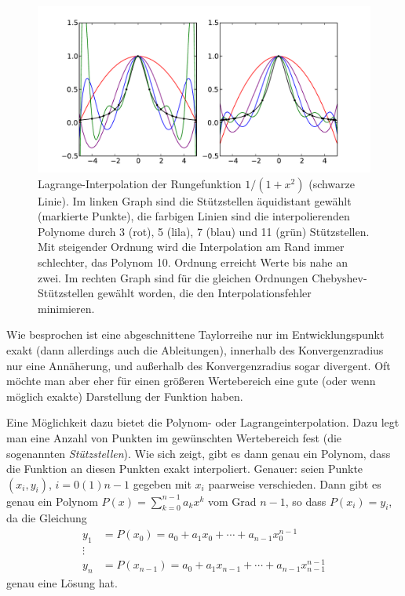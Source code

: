 \begin{figure}
  \centering
  \includegraphics[width=\textwidth]{plots/runge_lagrange}
  \caption{Lagrange-Interpolation der Rungefunktion $1/(1+x^2)$
    (schwarze Linie). Im linken Graph sind die Stützstellen
    äquidistant gewählt (markierte Punkte), die farbigen Linien sind
    die interpolierenden Polynome durch 3 (rot), 5 (lila), 7 (blau)
    und 11 (grün) Stützstellen. Mit steigender Ordnung wird die
    Interpolation am Rand immer schlechter, das Polynom 10. Ordnung
    erreicht Werte bis nahe an zwei. Im rechten Graph sind
    für die gleichen Ordnungen Chebyshev-Stützstellen gewählt worden,
    die den Interpolationsfehler minimieren.}
  \label{fig:runge}
\end{figure}

Wie besprochen ist eine abgeschnittene Taylorreihe nur im
Entwicklungspunkt exakt (dann allerdings auch die Ableitungen),
innerhalb des Konvergenzradius nur eine Annäherung, und außerhalb des
Konvergenzradius sogar divergent.  Oft möchte man aber eher für einen
größeren Wertebereich eine gute (oder wenn möglich exakte) Darstellung
der Funktion haben.

Eine Möglichkeit dazu bietet die Polynom- oder
Lagrangeinterpolation. Dazu legt man eine Anzahl von Punkten im
gewünschten Wertebereich fest (die sogenannten \emph{Stützstellen}).
Wie sich zeigt, gibt es dann genau ein Polynom, dass die Funktion an
diesen Punkten exakt interpoliert. Genauer: seien Punkte $(x_i, y_i)$,
$i=0(1)n-1$ gegeben mit $x_i$ paarweise verschieden. Dann gibt es
genau ein Polynom $P(x)=\sum_{k=0}^{n-1} a_kx^{k}$ vom Grad $n-1$, so
dass $P(x_i) = y_i$, da die Gleichung
\begin{equation}
  \begin{split}
    y_1 &= P(x_0) = a_0 + a_1 x_0 + \cdots + a_{n-1}x_0^{n-1}\\
    \vdots\\
    y_n &= P(x_{n-1}) = a_0 + a_1 x_{n-1} + \cdots + a_{n-1}x_{n-1}^{n-1}
  \end{split}
  \label{eq:interpol}
\end{equation}
genau eine Lösung hat.

